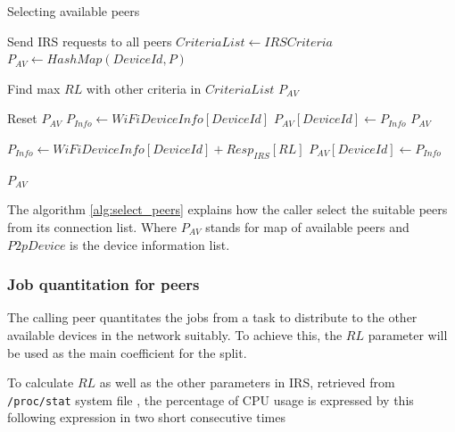 \documentclass[conference]{IEEEtran}
\begin{document}
\begin{algorithm}

\caption{Selecting available peers}
\label{alg:select_peers}
\begin{algorithmic}[1] 
\begin{scriptsize}
\State Send IRS requests to all peers 
\State $CriteriaList \leftarrow IRSCriteria$
\State $P_{AV} \leftarrow HashMap(DeviceId, P)$

  	\State Find max $RL$ with other criteria in $CriteriaList$
  	\State \Return $P_{AV}$
  \EndFor
\EndIf

  	\State Reset $P_{AV}$ 
  	\State $P_{Info} \leftarrow WiFiDeviceInfo[DeviceId]$
  	\State $P_{AV}[DeviceId] \leftarrow P_{Info}$
  	\State \Return $P_{AV}$
  \EndIf

  	\State $P_{Info} \leftarrow WiFiDeviceInfo[DeviceId] + Resp_{IRS}[RL]$
  	\State $P_{AV}[DeviceId] \leftarrow P_{Info}$
  \EndIf
\EndFor

\State \Return $P_{AV}$
\EndFunction
\end{scriptsize}
\end{algorithmic}

\end{algorithm}

The algorithm \ref{alg:select_peers} explains how the caller select the suitable peers from its connection list. Where $P_{AV}$ stands for map of available peers and $P2pDevice$ is the device information list.\\

\subsubsection{Job quantitation for peers}\label{ss_jqfp}

The calling peer quantitates the jobs from a task to distribute to the other available devices in the network suitably. To achieve this, the $RL$ parameter will be used as the main coefficient for the split. 
 
To calculate $RL$ as well as the other parameters in IRS, retrieved from \texttt{/proc/stat} system file \cite{stat_explain}, the percentage of CPU usage is expressed by this following expression in two short consecutive times
\end{document}
